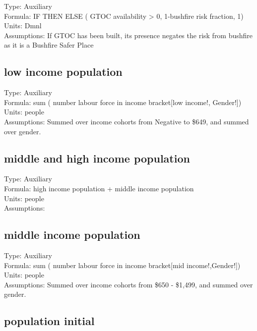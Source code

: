 \documentclass[
  11pt,
]{book}
\begin{document}
Type: Auxiliary\\
Formula: IF THEN ELSE ( GTOC availability \textgreater{} 0, 1-bushfire risk fraction, 1)\\
Units: Dmnl\\
Assumptions: If GTOC has been built, its presence negates the risk from bushfire as it is a Bushfire Safer Place

\hypertarget{low-income-population}{%
\subsection{low income population}\label{low-income-population}}

Type: Auxiliary\\
Formula: sum ( number labour force in income bracket{[}low income!, Gender!{]})\\
Units: people\\
Assumptions: Summed over income cohorts from Negative to \$649, and summed over gender.

\hypertarget{middle-and-high-income-population}{%
\subsection{middle and high income population}\label{middle-and-high-income-population}}

Type: Auxiliary\\
Formula: high income population + middle income population\\
Units: people\\
Assumptions:

\hypertarget{middle-income-population}{%
\subsection{middle income population}\label{middle-income-population}}

Type: Auxiliary\\
Formula: sum ( number labour force in income bracket{[}mid income!,Gender!{]})\\
Units: people\\
Assumptions: Summed over income cohorts from \$650 - \$1,499, and summed over gender.

\hypertarget{population-initial}{%
\subsection{population initial}\label{population-initial}}
\end{document}
